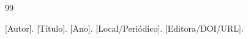 
\begin{thebibliography}{99}

[Autor]. [Título]. [Ano]. [Local/Periódico]. [Editora/DOI/URL].

\end{thebibliography}
